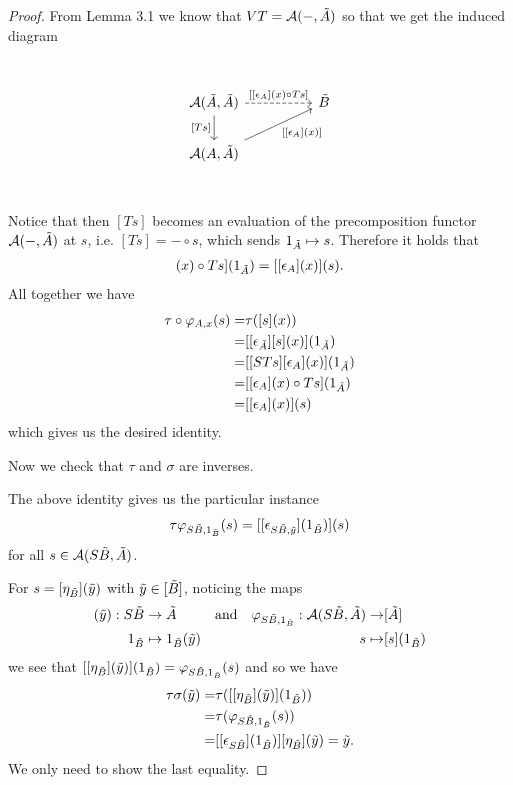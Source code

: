 \documentclass[12pt,a4paper]{article}
\def\HomA{\ensuremath\mathcal{A}}
\def\t{\ensuremath\tilde}
\begin{document}
\begin{proof}
From Lemma 3.1 we know that $VT = \HomA(-, \t A)$ so that we get the induced diagram
\[\begin{tikzcd}
	&& {} \\
	{\HomA(\t A, \t A)} && {\t B} \\
	{\HomA(A, \t A)}\\
	\arrow["{[[\epsilon_A](x)\circ Ts]}", dashed, from=2-1, to=2-3]
	\arrow["\text{[$Ts$]}"', from=2-1, to=3-1]
	\arrow["{[[\epsilon_A](x)]}"', from=3-1, to=2-3]
\end{tikzcd}\]
Notice that then $[Ts]$ becomes an evaluation of the precomposition functor $\HomA(-, \t A)$ at $s$, i.e. $[Ts] = - \circ s$, which sends $1_{\t A} \mapsto s$. Therefore it holds that \begin{align*}
 	[[\epsilon_A](x)\circ Ts](1_{\t A})=[[\epsilon_A](x)](s).
 \end{align*}
 All together we have \begin{align*}
 	\tau \circ \varphi_{A,x}(s)= &\tau([s](x))\\
 	=&[[\epsilon_{\t A}][s](x)](1_{\t A})\\
 	 =& [[STs][\epsilon_A](x)](1_{\t A})
 	\\=&[[\epsilon_A](x)\circ Ts](1_{\t A})\\
 	=&[[\epsilon_A](x)](s)
 \end{align*}
 which gives us the desired identity.
 
 Now we check that $\tau$ and $\sigma$ are inverses. 
 
 The above identity gives us the particular instance \begin{align*}
 	\tau \varphi_{S\t B, 1_{\t B}}(s) = [[\epsilon_{S\t B,\t y}](1_{\t B})](s)
 \end{align*}
 for all $s \in \HomA(S\t B, \t A)$.
 
 For $s = [\eta_{\t B}](\t y)$ with $\t y \in [\t B]$, noticing the maps \begin{align*}
 	[\eta_{\t B}](\t y): S\t B &\to \t A &\text{and} \ \ \ \varphi_{S\t B, 1_{\t B}}: \HomA(S\t B, \t A) \to & [\t A]\\
 	1_{\t B} &\mapsto 1_{\t B}(\t y)& s \mapsto& [s](1_{\t B})
 \end{align*}
 we see that $[[\eta_{\t B}](\t y)](1_{\t B}) = \varphi_{S \t B, 1_{\t B}}(s)$ and so we  have \begin{align*}
 	\tau \sigma (\t y) =& \tau ( [[\eta_{\t B}](\t y)](1_{\t B}))\\
 	 =&  \tau(\varphi_{S\t B, 1_{\t B}}(s))\\
 	 =& [[\epsilon_{S\t B}](1_{\t B})][\eta_{\t B}](\t y) = \t y.
 \end{align*}
 We only need to show the last equality. 
 

\end{proof}
\end{document}
